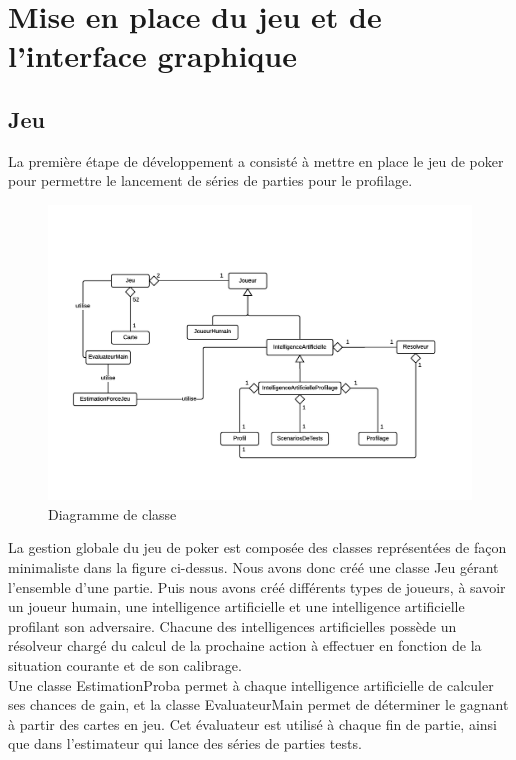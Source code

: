 \documentclass{report}
\begin{document}
\chapter{Mise en place du jeu et de l'interface graphique}
\section{Jeu}

\hspace{0.5cm}La première étape de développement a consisté à mettre en place le jeu de poker pour permettre le lancement de séries de parties pour le profilage.

\begin{figure}[H]
\hspace{-1.5cm}
		\includegraphics[scale=0.6]{./imagesRapport/DiagClasseJeu.png}
	\caption[Diagramme de classe]{Diagramme de classe}
\end{figure}

La gestion globale du jeu de poker est composée des classes représentées de façon minimaliste dans la figure ci-dessus. Nous avons donc créé une classe Jeu gérant l'ensemble d'une partie. Puis nous avons créé différents types de joueurs, à savoir un joueur humain, une intelligence artificielle et une intelligence artificielle profilant son adversaire. Chacune des intelligences artificielles possède un résolveur chargé du calcul de la prochaine action à effectuer en fonction de la situation courante et de son calibrage.\\

Une classe EstimationProba permet à chaque intelligence artificielle de calculer ses chances de gain, et la classe EvaluateurMain permet de déterminer le gagnant à partir des cartes en jeu. Cet évaluateur est utilisé à chaque fin de partie, ainsi que dans l'estimateur qui lance des séries de parties tests.\\
 
\end{document}
